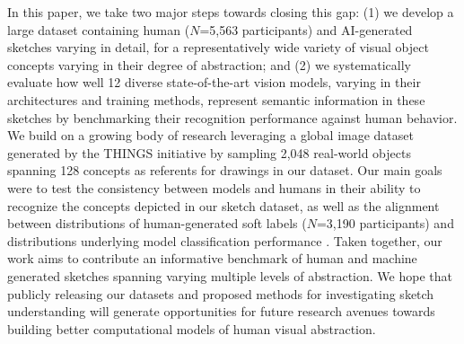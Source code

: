 \documentclass[10pt,letterpaper]{article}
\begin{document}
In this paper, we take two major steps towards closing this gap: 
(1) we develop a large dataset containing human ($N$=5,563 participants) and AI-generated sketches varying in detail, for a representatively wide variety of visual object concepts varying in their degree of abstraction; 
and (2) we systematically evaluate how well 12 diverse state-of-the-art vision models, varying in their architectures and training methods, represent semantic information in these sketches by benchmarking their recognition performance against human behavior. 
We build on a growing body of research leveraging a global image dataset generated by the THINGS initiative \cite{hebart2019things} by sampling 2,048 real-world objects spanning 128 concepts as referents for drawings in our dataset.
Our main goals were to test the consistency between models and humans in their ability to recognize the concepts depicted in our sketch dataset, as well as the alignment between distributions of human-generated soft labels ($N$=3,190 participants)  and distributions underlying model classification performance \cite{collins2022eliciting,peterson2019human}.
Taken together, our work aims to contribute an informative benchmark of human and machine generated sketches spanning varying multiple levels of abstraction. 
We hope that publicly releasing our datasets and proposed methods for investigating sketch understanding will generate opportunities for future research avenues towards building better computational models of human visual abstraction.
\end{document}
